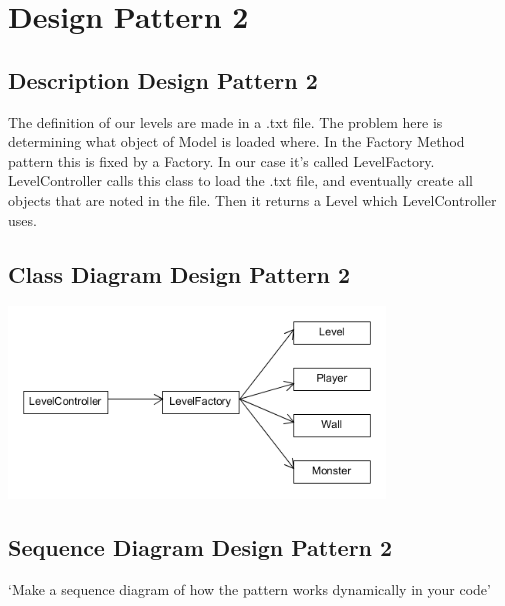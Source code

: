 \section{Design Pattern 2}

\subsection{Description Design Pattern 2}
The definition of our levels are made in a .txt file. The problem here is determining what object of Model is loaded where. In the Factory Method pattern this is fixed by a Factory. In our case it's called LevelFactory. LevelController calls this class to load the .txt file, and eventually create all objects that are noted in the file. Then it returns a Level which LevelController uses.


\subsection{Class Diagram Design Pattern 2}
\includegraphics[width=100mm]{UML_factory.png}

\subsection{Sequence Diagram Design Pattern 2}
`Make a sequence diagram of how the pattern works dynamically in your code'